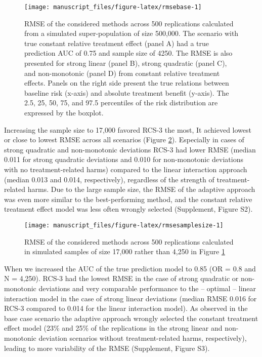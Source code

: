 \documentclass[]{elsarticle} %
\begin{document}
\begin{figure}
\texttt{[image: manuscript\_files/figure-latex/rmsebase-1]} \caption{RMSE of the considered methods across 500 replications calculated from a simulated super-population of size 500,000. The scenario with true constant relative treatment effect (panel A) had a true prediction AUC of 0.75 and sample size of 4250. The RMSE is also presented for strong linear (panel B), strong quadratic (panel C), and non-monotonic (panel D) from constant relative treatment effects. Panels on the right side present the true relations between baseline risk (x-axis) and absolute treatment benefit (y-axis). The 2.5, 25, 50, 75, and 97.5 percentiles of the risk distribution are expressed by the boxplot.}\label{fig:rmsebase}
\end{figure}

Increasing the sample size to 17,000 favored RCS-3 the most, It achieved
lowest or close to lowest RMSE across all scenarios (Figure
\ref{fig:rmsesamplesize}). Especially in cases of strong quadratic and
non-monotonic deviations RCS-3 had lower RMSE (median 0.011 for strong
quadratic deviations and 0.010 for non-monotonic deviations with no
treatment-related harms) compared to the linear interaction approach
(median 0.013 and 0.014, respectively), regardless of the strength of
treatment-related harms. Due to the large sample size, the RMSE of the
adaptive approach was even more similar to the best-performing method,
and the constant relative treatment effect model was less often wrongly
selected (Supplement, Figure S2).

\begin{figure}
\texttt{[image: manuscript\_files/figure-latex/rmsesamplesize-1]} \caption{RMSE of the considered methods across 500 replications calculated in simulated samples of size 17,000 rather than 4,250 in Figure \ref{fig:rmsebase}}\label{fig:rmsesamplesize}
\end{figure}

When we increased the AUC of the true prediction model to 0.85 (OR = 0.8
and N = 4,250). RCS-3 had the lowest RMSE in the case of strong
quadratic or non-monotonic deviations and very comparable performance to
the -- optimal -- linear interaction model in the case of strong linear
deviations (median RMSE 0.016 for RCS-3 compared to 0.014 for the linear
interaction model). As observed in the base case scenario the adaptive
approach wrongly selected the constant treatment effect model (23\% and
25\% of the replications in the strong linear and non-monotonic
deviation scenarios without treatment-related harms, respectively),
leading to more variability of the RMSE (Supplement, Figure S3).
\end{document}
